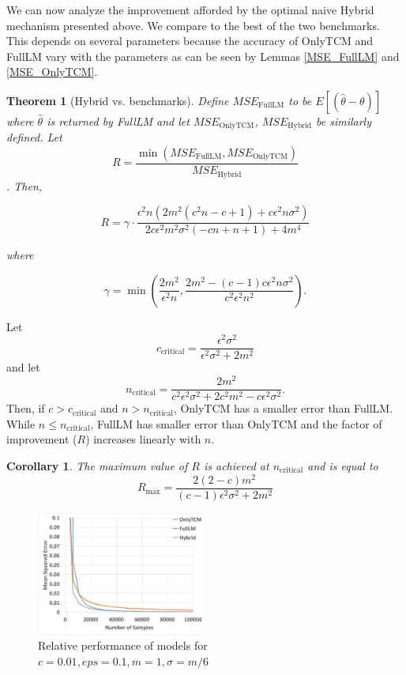 \documentclass{article}
\theoremstyle{plain}
\newtheorem{thm}{Theorem}[section]
\newtheorem*{cor}{Corollary}
\begin{document}
We can now analyze the improvement afforded by the optimal naive Hybrid mechanism presented above. We compare to the best of the two benchmarks. This depends on several parameters because the accuracy of OnlyTCM and FullLM vary with the parameters as can be seen by Lemmas \ref{MSE_FullLM} and \ref{MSE_OnlyTCM}. 

\begin{thm}[Hybrid vs. benchmarks]
Define $MSE_{\text{FullLM}}$ to be $E[(\hat{\theta} - \theta)]$ where $\hat{\theta}$ is returned by FullLM and let $MSE_{\text{OnlyTCM}}$, $MSE_{\text{Hybrid}}$ be similarly defined.
Let 
$$R = \frac{\min(MSE_{\text{FullLM}}, MSE_{\text{OnlyTCM}})}{MSE_{\text{Hybrid}}}$$.
Then, 

$$R = \gamma \cdot \frac{\epsilon^2 n \left(2 m^2 \left(c^2 n-c+1\right)+c \epsilon^2 n \sigma^2\right)}{2 c \epsilon^2 m^2 \sigma^2 (-c n+n+1)+4 m^4}$$

where 

$$\gamma = \min \left(\frac{2 m^2}{\epsilon^2 n},\frac{2 m^2-(c-1) c \epsilon^2 n \sigma^2}{c^2 \epsilon^2 n^2}\right).$$
\end{thm}

Let $$c_{\text{critical}} = \frac{\epsilon^2 \sigma^2}{\epsilon^2 \sigma^2+2 m^2}$$ and let $$n_{\text{critical}} = \frac{2 m^2}{c^2 \epsilon^2 \sigma^2+2 c^2 m^2-c \epsilon^2 \sigma^2}.$$ Then, if $c>c_{\text{critical}}$ and $n > n_{\text{critical}}$, OnlyTCM has a smaller error than FullLM. While $n \leq n_{\text{critical}}$, FullLM has smaller error than OnlyTCM and the factor of improvement ($R$) increases linearly with $n$. 

\begin{cor}
The maximum value of $R$ is achieved at $n_{\text{critical}}$ and is equal to $$R_{\text{max}} = \frac{2 (2-c) m^2}{(c-1) \epsilon^2 \sigma^2+2 m^2}$$
\end{cor}

\begin{figure}[h]
\includegraphics[width=0.5\textwidth]{eps01c01.pdf}
\caption{Relative performance of models for $c=0.01, eps=0.1, m=1, \sigma = m/6$}
\end{figure}
\end{document}
